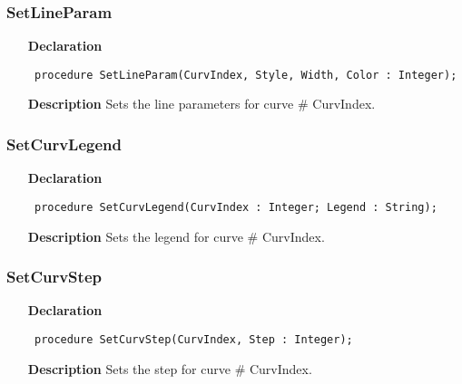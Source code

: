 \documentclass[12pt,a4paper,oneside]{report}
\newcommand{\declarationitem}[1]{\textbf{#1}}
\newcommand{\descriptiontitle}[1]{\textbf{#1}}
\newcommand{\code}[1]{\texttt{#1}}
\begin{document}
\subsubsection{SetLineParam}
\label{uplot-SetLineParam}
\begin{itemize}\item[\declarationitem{Declaration}\hfill]
	\begin{flushleft}
		\code{
			procedure SetLineParam(CurvIndex, Style, Width, Color : Integer);}
		
	\end{flushleft}
	
	\par
	\item[\descriptiontitle{Description}]
	Sets the line parameters for curve {\#} CurvIndex.
	
\end{itemize}
\subsubsection{SetCurvLegend}
\label{uplot-SetCurvLegend}
\begin{itemize}\item[\declarationitem{Declaration}\hfill]
	\begin{flushleft}
		\code{
			procedure SetCurvLegend(CurvIndex : Integer; Legend : String);}
		
	\end{flushleft}
	
	\par
	\item[\descriptiontitle{Description}]
	Sets the legend for curve {\#} CurvIndex.
	
\end{itemize}
\subsubsection{SetCurvStep}
\label{uplot-SetCurvStep}
\begin{itemize}\item[\declarationitem{Declaration}\hfill]
	\begin{flushleft}
		\code{
			procedure SetCurvStep(CurvIndex, Step : Integer);}
		
	\end{flushleft}
	
	\par
	\item[\descriptiontitle{Description}]
	Sets the step for curve {\#} CurvIndex.
	
\end{itemize}
\end{document}
